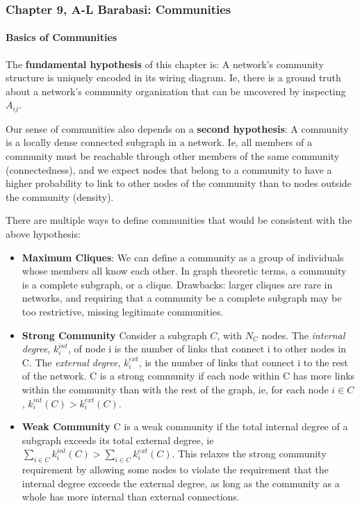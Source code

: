 \documentclass[11pt]{scrartcl} %
\begin{document}
\subsubsection{Chapter 9, A-L Barabasi: Communities}
\paragraph{Basics of Communities}
The \textbf{fundamental hypothesis} of this chapter is: A network's community structure is uniquely encoded in its wiring diagram. Ie, there is a ground truth about a network's community organization that can be uncovered by inspecting $A_{ij}$.

Our sense of communities also depends on a \textbf{second hypothesis}: A community is a locally dense connected subgraph in a network. Ie, all members of a community must be reachable through other members of the same community (connectedness), and we expect nodes that belong to a community to have a higher probability to link to other nodes of the community than to nodes outside the community (density).

There are multiple ways to define communities that would be consistent with the above hypothesis:
\begin{itemize}
	\item \textbf{Maximum Cliques}: We can define a community as a group of individuals whose members all know each other. In graph theoretic terms, a community is a complete subgraph, or a clique. Drawbacks: larger cliques are rare in networks, and requiring that a community be a complete subgraph may be too restrictive, missing legitimate communities.
	\item \textbf{Strong Community} Consider a subgraph $C$, with $N_C$ nodes. The \emph{internal degree}, $k_{i}^{int}$, of node i is the number of links that connect i to other nodes in C. The \emph{external degree}, $k_{i}^{ext}$, is the number of links that connect i to the rest of the network. C is a strong community if each node within C has more links within the community than with the rest of the graph, ie, for each node $i \in C$, $k_{i}^{int}(C) > k_{i}^{ext}(C)$.
	\item \textbf{Weak Community} C is a weak community if the total internal degree of a subgraph exceeds its total external degree, ie $\sum_{i \in C} k_{i}^{int}(C) > \sum_{i \in C} k_{i}^{ext}(C)$. This relaxes the strong community requirement by allowing some nodes to violate the requirement that the internal degree exceeds the external degree, as long as the community as a whole has more internal than external connections.
\end{itemize}
\end{document}

